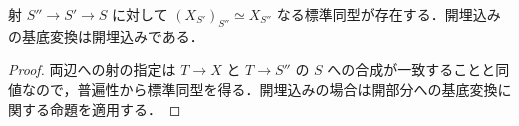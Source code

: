 \begin{prop}[基底変換の合成]
射 $S''\to S'\to S$ に対して $(X_{S'})_{S''}\simeq X_{S''}$ なる標準同型が存在する．開埋込みの基底変換は開埋込みである．
\end{prop}
\begin{proof}
両辺への射の指定は $T\to X$ と $T\to S''$ の $S$ への合成が一致することと同値なので，普遍性から標準同型を得る．開埋込みの場合は開部分への基底変換に関する命題を適用する．
\end{proof}

